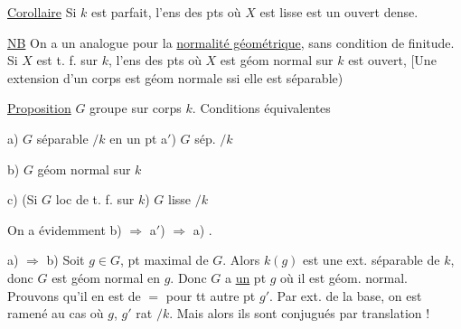 \uline{Corollaire} Si $k$ est parfait, l'ens des pts où $X$ est lisse est un ouvert dense.

\uline{NB} On a un  analogue pour la \uline{normalité géométrique}, sans condition de finitude. Si $X$ est   t. f. sur $k$, l'ens des pts où $X$ est géom normal sur $k$ est ouvert,  [Une extension d'un corps est géom normale ssi elle est séparable)


\uline{Proposition} $G$ groupe sur corps $k$. Conditions équivalentes


a) $G$  séparable $/k$ en un pt \qquad a$'$) $G$ sép. $/k$ 

b) $G$ géom normal sur $k$

c) (Si $G$ loc de t. f. sur $k$) $G$ lisse $/k$

On a évidemment  b) $\Rightarrow$ a$'$) $\Longrightarrow$ a) .


a) $\Rightarrow$ b) \qquad Soit $g\in G$,  pt maximal de $G$.   Alors $k(g)$ est une ext. séparable de $k$, donc $G$ est géom normal en $g$.   Donc $G$ a \uline{un} pt $g$ où il est géom. normal. Prouvons qu'il en est de $=$ pour tt autre pt $g'$. Par ext. de la base, on est ramené au cas où $g$, $g'$ rat $/k$. Mais alors ils sont conjugués par translation !

